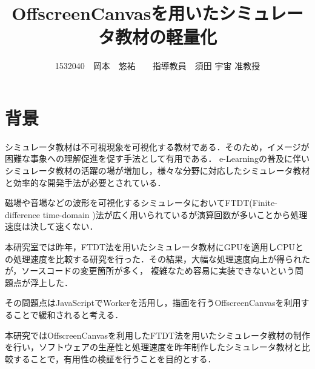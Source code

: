 \documentclass[twocolumn,10pt,a4j]{jsarticle}
\title{OffscreenCanvasを用いたシミュレータ教材の軽量化}
\author{1532040　岡本　悠祐　　指導教員　須田 宇宙 准教授}
\date{}
\begin{document}
\maketitle
\section{背景}
シミュレータ教材は不可視現象を可視化する教材である．そのため，イメージが困難な事象への理解促進を促す手法として有用である．
e-Learningの普及に伴いシミュレータ教材の活躍の場が増加し，様々な分野に対応したシミュレータ教材と効率的な開発手法が必要とされている．

磁場や音場などの波形を可視化するシミュレータにおいてFTDT(Finite-difference time-domain )法が広く用いられているが演算回数が多いことから処理速度は決して速くない．

本研究室では昨年，FTDT法を用いたシミュレータ教材にGPUを適用しCPUとの処理速度を比較する研究を行った．その結果，大幅な処理速度向上が得られたが，ソースコードの変更箇所が多く，
複雑なため容易に実装できないという問題点が浮上した．

その問題点はJavaScriptでWorkerを活用し，描画を行うOffscreenCanvasを利用することで緩和されると考える．

本研究ではOffscreenCanvasを利用したFTDT法を用いたシミュレータ教材の制作を行い，ソフトウェアの生産性と処理速度を昨年制作したシミュレータ教材と比較することで，有用性の検証を行うことを目的とする．

\end{document}
